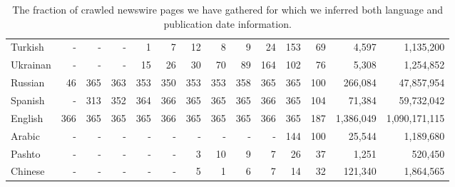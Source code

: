 \documentclass{article}
\begin{document}
\begin{table}[h!]
\begin{center}
\begin{tabular}{l|rrrrrrrrrrr|rr}
Turkish	&	-	&	-	&	-	&	1	&	7	&	12	&	8	&	9	&	24	&	153	&	69	&	4,597	&	1,135,200\\
Ukrainan	&	-	&	-	&	-	&	15	&	26	&	30	&	70	&	89	&	164	&	102	&	76	&	5,308	&	1,254,852\\
Russian	&	46	&	365	&	363	&	353	&	350	&	353	&	353	&	358	&	365	&	365	&	100	&	266,084	&	47,857,954\\
Spanish	&	-	&	313	&	352	&	364	&	366	&	365	&	365	&	365	&	366	&	365	&	104	&	71,384	&	59,732,042\\
English	&	366	&	365	&	365	&	365	&	366	&	365	&	365	&	365	&	366	&	365	&	187	&	1,386,049	&	1,090,171,115\\
Arabic	&	-	&	-	&	-	&	-	&	-	&	-	&	-	&	-	&	-	&	144	&	100	&	25,544	&	1,189,680\\
Pashto	&	-	&	-	&	-	&	-	&	-	&	3	&	10	&	9	&	7	&	26	&	37	&	1,251	&	520,450\\
Chinese	&	-	&	-	&	-	&	-	&	-	&	5	&	1	&	6	&	7	&	14	&	32	&	121,340	&	1,864,565\\
\end{tabular}
\end{center}
\normalsize
\caption{The fraction of crawled newswire pages we have gathered for which we inferred both language and publication date information.}
\label{fig:newsstats}
\end{table}
\end{document}

